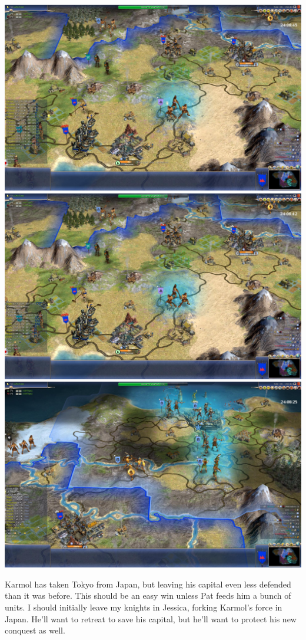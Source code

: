 \documentclass[10pt]{article}
\begin{document}
\includegraphics[width=1.0\textwidth]{turn184-1}
\includegraphics[width=1.0\textwidth]{turn184-2}
\includegraphics[width=1.0\textwidth]{turn184-3}

Karmol has taken Tokyo from Japan, but leaving his capital even less
defended than it was before. This should be an easy win unless Pat
feeds him a bunch of units. I should initially leave my knights in
Jessica, forking Karmol's force in Japan. He'll want to retreat to
save his capital, but he'll want to protect his new conquest as well.
\end{document}
